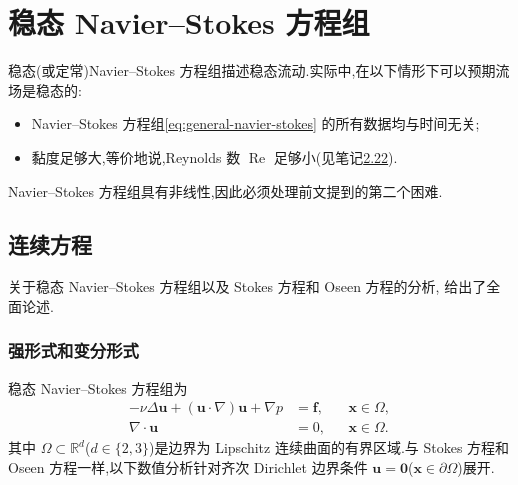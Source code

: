 \chapter{稳态 Navier--Stokes 方程组}\label{chap:steady-navier-stokes}

\begin{note}\label{note:steady-navier-stokes}
稳态(或定常)Navier--Stokes 方程组描述稳态流动.实际中,在以下情形下可以预期流场是稳态的:
\begin{itemize}
  \item Navier--Stokes 方程组\cref{eq:general-navier-stokes} 的所有数据均与时间无关;
  \item 黏度足够大,等价地说,Reynolds 数 $\operatorname{Re}$ 足够小(见笔记\hyperref[note:special-incompressible-models]{2.22}).
\end{itemize}
Navier--Stokes 方程组具有非线性,因此必须处理前文提到的第二个困难.
\end{note}

\section{连续方程}\label{sec:steady-ns-continuous}

\begin{note}[专著]\label{note:steady-ns-monograph}
关于稳态 Navier--Stokes 方程组以及 Stokes 方程和 Oseen 方程的分析,\textcite{Galdi2011} 给出了全面论述.
\end{note}

\subsection{强形式和变分形式}\label{subsec:steady-ns-strong-variational}

\begin{note}\label{note:steady-ns-strong-form}
稳态 Navier--Stokes 方程组为
\begin{equation}\label{eq:steady-ns-strong}
\begin{aligned}
  -\nu\Delta\bm{u}+ (\bm{u}\cdot\nabla)\bm{u}+\nabla p
    &=\bm{f},&&\bm{x}\in\Omega,\\
  \nabla\cdot\bm{u}&=0,&&\bm{x}\in\Omega.
\end{aligned}
\end{equation}
其中 $\Omega\subset\mathbb{R}^d$($d\in\{2,3\}$)是边界为 Lipschitz 连续曲面的有界区域.与 Stokes 方程和 Oseen 方程一样,以下数值分析针对齐次 Dirichlet 边界条件 $\bm{u}=\bm{0}$($\bm{x}\in\partial\Omega$)展开.
\end{note}

